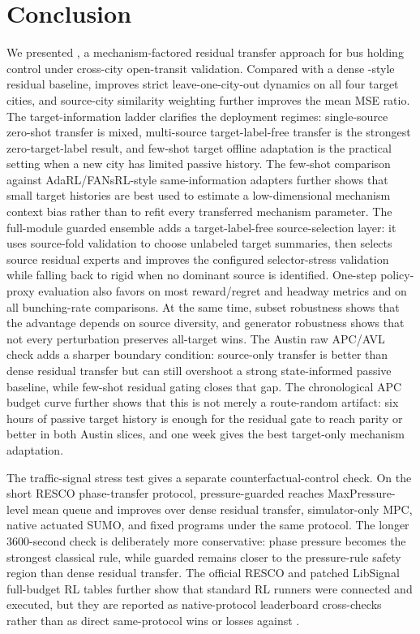 \section{Conclusion}

We presented \ours, a mechanism-factored residual transfer approach for bus holding control under cross-city open-transit validation.
Compared with a dense \Htwo-style residual baseline, \ours improves strict leave-one-city-out dynamics on all four target cities, and source-city similarity weighting further improves the mean MSE ratio.
The target-information ladder clarifies the deployment regimes: single-source zero-shot transfer is mixed, multi-source target-label-free transfer is the strongest zero-target-label result, and few-shot target offline adaptation is the practical setting when a new city has limited passive history.
The few-shot comparison against AdaRL/FANsRL-style same-information adapters further shows that small target histories are best used to estimate a low-dimensional mechanism context bias rather than to refit every transferred mechanism parameter.
The full-module guarded ensemble adds a target-label-free source-selection layer: it uses source-fold validation to choose unlabeled target summaries, then selects source residual experts and improves the configured selector-stress validation while falling back to rigid \ours when no dominant source is identified.
One-step policy-proxy evaluation also favors \ours on most reward/regret and headway metrics and on all bunching-rate comparisons.
At the same time, subset robustness shows that the advantage depends on source diversity, and generator robustness shows that not every perturbation preserves all-target wins.
The Austin raw APC/AVL check adds a sharper boundary condition: source-only transfer is better than dense residual transfer but can still overshoot a strong state-informed passive baseline, while few-shot residual gating closes that gap.
The chronological APC budget curve further shows that this is not merely a route-random artifact: six hours of passive target history is enough for the residual gate to reach parity or better in both Austin slices, and one week gives the best target-only mechanism adaptation.

The traffic-signal stress test gives a separate counterfactual-control check.
On the short RESCO phase-transfer protocol, pressure-guarded \ours reaches MaxPressure-level mean queue and improves over dense residual transfer, simulator-only MPC, native actuated SUMO, and fixed programs under the same protocol.
The longer 3600-second check is deliberately more conservative: phase pressure becomes the strongest classical rule, while guarded \ours remains closer to the pressure-rule safety region than dense residual transfer.
The official RESCO and patched LibSignal full-budget RL tables further show that standard RL runners were connected and executed, but they are reported as native-protocol leaderboard cross-checks rather than as direct same-protocol wins or losses against \ours.

